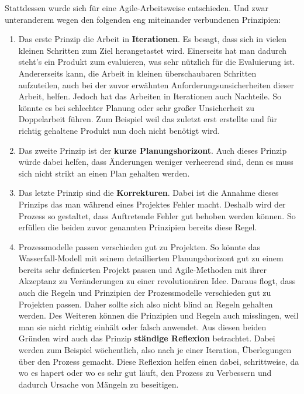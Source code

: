 \myNewSection
Stattdessen wurde sich für eine Agile-Arbeitsweise entschieden. Und zwar unteranderem wegen den folgenden eng miteinander verbundenen Prinzipien:
	\begin{enumerate}
		\item Das erste Prinzip die Arbeit in \textbf{Iterationen}. Es besagt, dass sich in vielen kleinen Schritten zum Ziel herangetastet wird. 
			Einerseits hat man dadurch steht's ein Produkt zum evaluieren, was sehr nützlich für die Evaluierung ist. Andererseits kann, die Arbeit in kleinen überschaubaren Schritten aufzuteilen, auch bei der zuvor erwähnten Anforderungsunsicherheiten dieser Arbeit, helfen. \newline%
			Jedoch hat das Arbeiten in Iterationen auch Nachteile. So könnte es bei schlechter Planung oder sehr großer Unsicherheit zu Doppelarbeit führen. Zum Beispiel weil das zuletzt erst erstellte und für richtig gehaltene Produkt nun doch nicht benötigt wird.
		\item Das zweite Prinzip ist der \textbf{kurze Planungshorizont}. Auch dieses Prinzip würde dabei helfen, dass Änderungen weniger verheerend sind, denn es muss sich nicht strikt an einen Plan gehalten werden.
		\item Das letzte Prinzip sind die \textbf{Korrekturen}. Dabei ist die Annahme dieses Prinzips das man während eines Projektes Fehler macht. Deshalb wird der Prozess so gestaltet, dass Auftretende Fehler gut behoben werden können. So erfüllen die beiden zuvor genannten Prinzipien bereits diese \dq Regel\dq.
		\item Prozessmodelle passen verschieden gut zu Projekten. So könnte das Wasserfall-Modell mit seinem detaillierten Planungshorizont gut zu einem bereits sehr definierten Projekt passen und Agile-Methoden mit ihrer Akzeptanz zu Veränderungen zu einer revolutionären Idee. Daraus flogt, dass auch die Regeln und Prinzipien der Prozessmodelle verschieden gut zu Projekten passen. Daher sollte sich also nicht blind an Regeln gehalten werden. \newline%
			Des Weiteren können die Prinzipien und Regeln auch misslingen, weil man sie nicht richtig einhält oder falsch anwendet. \newline%
			Aus diesen beiden Gründen wird auch das Prinzip \textbf{ständige Reflexion} betrachtet. Dabei werden zum Beispiel wöchentlich, also nach je einer Iteration, Überlegungen über den Prozess gemacht. Diese Reflexion helfen einen dabei, schrittweise, da wo es hapert oder wo es sehr gut läuft, den Prozess zu Verbessern und dadurch Ursache von Mängeln zu beseitigen.
	\end{enumerate}